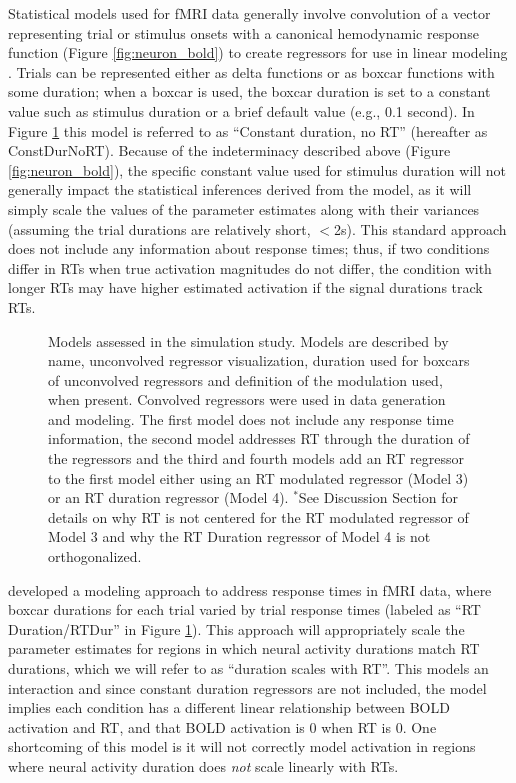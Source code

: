 \documentclass[sn-mathphys,Numbered, super, referee, lineno]{sn-jnl}
\begin{document}
Statistical models used for fMRI data generally involve convolution of a vector representing trial or stimulus onsets with a canonical hemodynamic response function (Figure \ref{fig:neuron_bold})  to create regressors for use in linear modeling \citep{PoldrackMumfordNichols2009}.  Trials can be represented either as delta functions or as boxcar functions with some duration; when a boxcar is used,  the boxcar duration is set to a constant value such as stimulus duration or a brief default value (e.g., 0.1 second).  In Figure \ref{fig:models} this model is referred to as ``Constant duration, no RT'' (hereafter as ConstDurNoRT).  Because of the indeterminacy described above (Figure \ref{fig:neuron_bold}), the specific constant value used for stimulus duration will not generally impact the statistical inferences derived from the model, as it will simply scale the values of the parameter estimates along with their variances (assuming the trial durations are relatively short, $<$2s).   This standard approach does not include any information about response times; thus, if two conditions differ in RTs when true activation magnitudes do not differ, the condition with longer RTs may have higher estimated activation if the signal durations track RTs.  

\begin{figure}[ht!]
  \centering
   \caption{Models assessed in the simulation study.  Models are described by name, unconvolved regressor visualization, duration used for boxcars of unconvolved regressors and definition of the modulation used, when present.  Convolved regressors were used in data generation and modeling.  The first model does not include any response time information, the second model addresses RT through the duration of the regressors and the third and fourth models add an RT regressor to the first model either using an RT modulated regressor (Model 3) or an RT duration regressor (Model 4).  $^*$See Discussion Section for details on why RT is not centered for the RT modulated regressor of Model 3 and why the RT Duration regressor of Model 4 is not orthogonalized.}
  \label{fig:models}
\end{figure}

\citet{grinband_detection_2008} developed a modeling approach to address response times in fMRI data, where boxcar durations for each trial varied by trial response times (labeled as ``RT Duration/RTDur'' in Figure \ref{fig:models}).  This approach will appropriately scale the parameter estimates for regions in which neural activity durations match RT durations, which we will refer to as ``duration scales with RT''. This models an interaction and since constant duration regressors are not included, the model implies each condition has a different linear relationship between BOLD activation and RT, and that BOLD activation is 0 when RT is 0.  One shortcoming of this model is it will not correctly model activation in regions where neural activity duration does \textit{not} scale linearly with RTs.  
\end{document}
